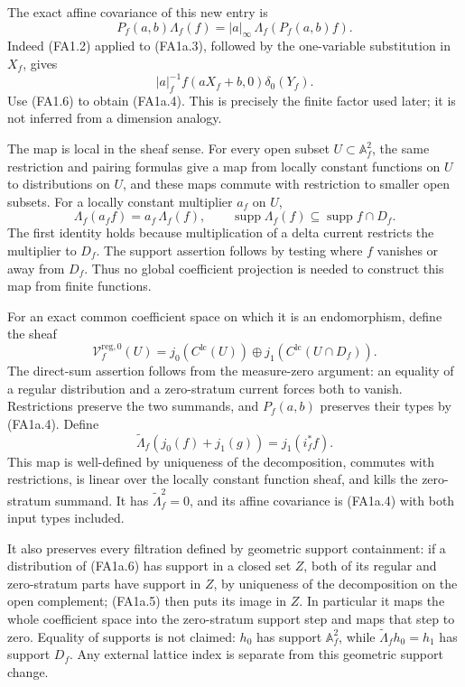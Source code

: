 The exact affine covariance of this new entry is \[
 \boxed{
 P_f(a,b)\Lambda_f(f)
     =|a|_\infty\,\Lambda_f(P_f(a,b)f).
 }
\tag{FA1a.4}
\] Indeed (FA1.2) applied to (FA1a.3), followed by the one-variable
substitution in \(X_f\), gives \[
 |a|_f^{-1}f(aX_f+b,0)\delta_0(Y_f).
\] Use (FA1.6) to obtain (FA1a.4). This is precisely the finite factor
used later; it is not inferred from a dimension analogy.

The map is local in the sheaf sense. For every open subset
\(U\subset\mathbb A_f^2\), the same restriction and pairing formulas
give a map from locally constant functions on \(U\) to distributions on
\(U\), and these maps commute with restriction to smaller open subsets.
For a locally constant multiplier \(a_f\) on \(U\), \[
 \Lambda_f(a_f f)
     =a_f\,\Lambda_f(f),\qquad
 \operatorname{supp}\Lambda_f(f)
     \subseteq\operatorname{supp}f\cap D_f.
\tag{FA1a.5}
\] The first identity holds because multiplication of a delta current
restricts the multiplier to \(D_f\). The support assertion follows by
testing where \(f\) vanishes or away from \(D_f\). Thus no global
coefficient projection is needed to construct this map from finite
functions.

For an exact common coefficient space on which it is an endomorphism,
define the sheaf \[
 \mathscr V_f^{\mathrm{reg,0}}(U)
   =j_0(C^{\mathrm{lc}}(U))
       \oplus j_1(C^{\mathrm{lc}}(U\cap D_f)).
\tag{FA1a.6}
\] The direct-sum assertion follows from the measure-zero argument: an
equality of a regular distribution and a zero-stratum current forces
both to vanish. Restrictions preserve the two summands, and \(P_f(a,b)\)
preserves their types by (FA1a.4). Define \[
 \widetilde\Lambda_f(j_0(f)+j_1(g))=j_1(i_f^*f).
\tag{FA1a.7}
\] This map is well-defined by uniqueness of the decomposition, commutes
with restrictions, is linear over the locally constant function sheaf,
and kills the zero-stratum summand. It has \(\widetilde\Lambda_f^2=0\),
and its affine covariance is (FA1a.4) with both input types included.

It also preserves every filtration defined by geometric support
containment: if a distribution of (FA1a.6) has support in a closed set
\(Z\), both of its regular and zero-stratum parts have support in \(Z\),
by uniqueness of the decomposition on the open complement; (FA1a.5) then
puts its image in \(Z\). In particular it maps the whole coefficient
space into the zero-stratum support step and maps that step to zero.
Equality of supports is not claimed: \(h_0\) has support
\(\mathbb A_f^2\), while \(\widetilde\Lambda_fh_0=h_1\) has support
\(D_f\). Any external lattice index is separate from this geometric
support change.

